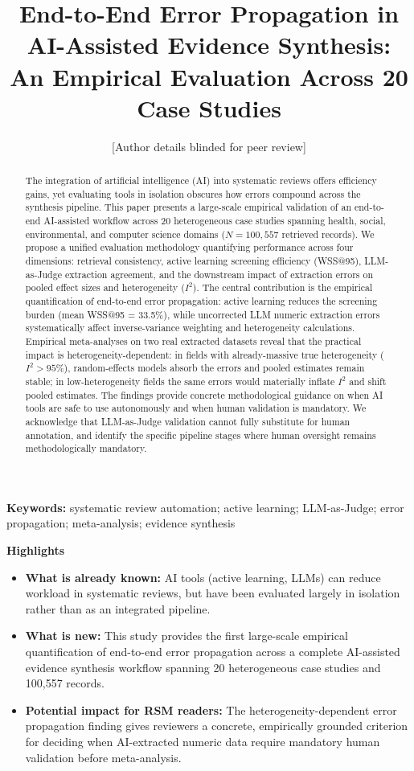 \documentclass[12pt]{article}
\title{End-to-End Error Propagation in AI-Assisted Evidence Synthesis: An Empirical Evaluation Across 20 Case Studies}
\author{[Author details blinded for peer review]}
\date{}
\begin{document}
\maketitle

\begin{abstract}
The integration of artificial intelligence (AI) into systematic reviews offers efficiency gains, yet evaluating tools in isolation obscures how errors compound across the synthesis pipeline. This paper presents a large-scale empirical validation of an end-to-end AI-assisted workflow across 20 heterogeneous case studies spanning health, social, environmental, and computer science domains ($N = 100{,}557$ retrieved records). We propose a unified evaluation methodology quantifying performance across four dimensions: retrieval consistency, active learning screening efficiency (WSS@95), LLM-as-Judge extraction agreement, and the downstream impact of extraction errors on pooled effect sizes and heterogeneity ($I^2$). The central contribution is the empirical quantification of end-to-end error propagation: active learning reduces the screening burden (mean WSS@95 = 33.5\%), while uncorrected LLM numeric extraction errors systematically affect inverse-variance weighting and heterogeneity calculations. Empirical meta-analyses on two real extracted datasets reveal that the practical impact is heterogeneity-dependent: in fields with already-massive true heterogeneity ($I^2 > 95\%$), random-effects models absorb the errors and pooled estimates remain stable; in low-heterogeneity fields the same errors would materially inflate $I^2$ and shift pooled estimates. The findings provide concrete methodological guidance on when AI tools are safe to use autonomously and when human validation is mandatory. We acknowledge that LLM-as-Judge validation cannot fully substitute for human annotation, and identify the specific pipeline stages where human oversight remains methodologically mandatory.
\end{abstract}

\noindent\textbf{Keywords:} systematic review automation; active learning; LLM-as-Judge; error propagation; meta-analysis; evidence synthesis

\vspace{1em}
\noindent\textbf{Highlights}
\begin{itemize}[leftmargin=1.5em]
  \item \textbf{What is already known:} AI tools (active learning, LLMs) can reduce workload in systematic reviews, but have been evaluated largely in isolation rather than as an integrated pipeline.
  \item \textbf{What is new:} This study provides the first large-scale empirical quantification of end-to-end error propagation across a complete AI-assisted evidence synthesis workflow spanning 20 heterogeneous case studies and 100,557 records.
  \item \textbf{Potential impact for RSM readers:} The heterogeneity-dependent error propagation finding gives reviewers a concrete, empirically grounded criterion for deciding when AI-extracted numeric data require mandatory human validation before meta-analysis.
\end{itemize}
\end{document}
